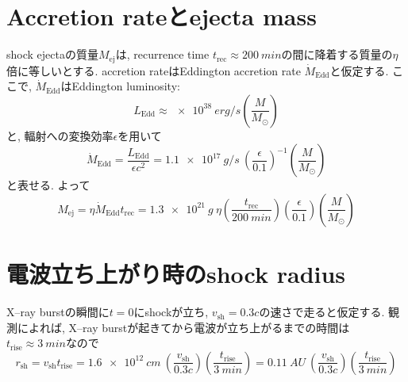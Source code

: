 \documentclass{ltjsarticle}
\begin{document}

\section{Accretion rateとejecta mass}
shock ejectaの質量$M_\mathrm{ej}$は, recurrence time \( t_\mathrm{rec} \approx \SI{200}{min} \)の間に降着する質量の$\eta$倍に等しいとする. 
accretion rateはEddington accretion rate $\dot{M}_{\mathrm{Edd}}$と仮定する.
ここで, $\dot{M}_{\mathrm{Edd}}$はEddington luminosity:
\begin{equation}
  L_\mathrm{Edd} \approx \SI{e38}{erg/s}\left( \frac{M}{M_\odot} \right)
\end{equation}
と, 輻射への変換効率$\epsilon$を用いて
\begin{equation}
  \dot{M}_{\mathrm{Edd}} = \frac{L_\mathrm{Edd}}{\epsilon c^2}
  =
  \SI{1.1e17}{g/s}~
  \left( \frac{\epsilon}{0.1} \right)^{-1}
  \left( \frac{M}{M_\odot} \right)
\end{equation}
と表せる. よって
\begin{equation}
  M_\mathrm{ej}
  =
  \eta\dot{M}_\mathrm{Edd} t_\mathrm{rec}
  =
  \SI{1.3e21}{g}~\eta
  \left( \frac{t_\mathrm{rec}}{\SI{200}{min}} \right)
  \left( \frac{\epsilon}{0.1} \right)
  \left( \frac{M}{M_\odot} \right)
\end{equation}

\section{電波立ち上がり時のshock radius}
X--ray burstの瞬間に\(t=0\)にshockが立ち, \(v_\mathrm{sh} = 0.3c\)の速さで走ると仮定する.
観測によれば, X--ray burstが起きてから電波が立ち上がるまでの時間は\( t_\mathrm{rise} \approx \SI{3}{min} \)なので
\begin{equation}
  r_\mathrm{sh} = v_\mathrm{sh}t_\mathrm{rise} 
  =
  \SI{1.6e12}{cm}~\left(\frac{v_\mathrm{sh}}{0.3c}\right)\left( \frac{t_\mathrm{rise}}{\SI{3}{min}} \right)
  =
  \SI{0.11}{AU}~\left(\frac{v_\mathrm{sh}}{0.3c}\right)\left( \frac{t_\mathrm{rise}}{\SI{3}{min}} \right)
\end{equation}
\end{document}
